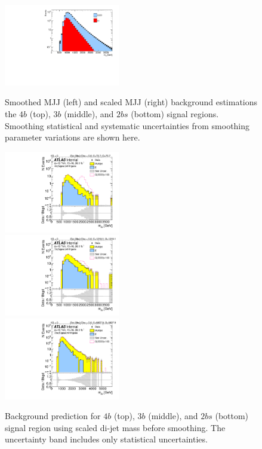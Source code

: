 \begin{figure}[htbp!]
\begin{center}
\includegraphics[width=0.45\textwidth,angle=-90]{figures/boosted/Smooth/TwoTag_split_pole_smoothed.pdf}\\
\caption{Smoothed MJJ (left) and scaled MJJ (right) background estimations the $4b$ (top), $3b$ (middle), and $2bs$ (bottom) signal regions. Smoothing statistical and systematic uncertainties from smoothing parameter variations are shown here. }
\label{fig:fig:signal-region-mjjscaled-smooth-bkg}
\end{center}
\end{figure}

\begin{figure}[htbp!]
\begin{center}
\includegraphics[width=0.45\textwidth,angle=-90]{figures/boosted/Signal/b77_FourTag_Signal_mHH_pole_1_blind.pdf}\\
\includegraphics[width=0.45\textwidth,angle=-90]{figures/boosted/Signal/b77_ThreeTag_Signal_mHH_pole_1_blind.pdf}\\
\includegraphics[width=0.45\textwidth,angle=-90]{figures/boosted/Signal/b77_TwoTag_split_Signal_mHH_pole_1_blind.pdf}
\end{center}
\caption{Background prediction for $4b$ (top), $3b$ (middle), and $2bs$ (bottom) signal region using scaled di-jet mass before smoothing. The uncertainty band includes only statistical uncertainties.}
\label{fig:signal-region-mjjscaled-nonsmooth-bkg-noSYS}
\end{figure}


